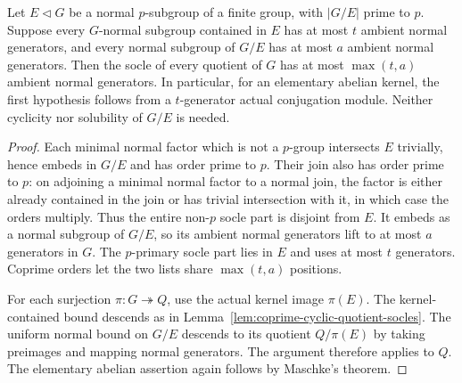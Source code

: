\begin{lemma}
\label{lem:coprime-quotient-socles}
Let $E\lhd G$ be a normal $p$-subgroup of a finite group, with
$|G/E|$ prime to $p$. Suppose every $G$-normal subgroup contained in
$E$ has at most $t$ ambient normal generators, and every normal
subgroup of $G/E$ has at most $a$ ambient normal generators.
Then the socle of every quotient of $G$ has at most $\max(t,a)$
ambient normal generators. In particular, for an elementary abelian
kernel, the first hypothesis follows from a $t$-generator actual
conjugation module. Neither cyclicity nor solubility of $G/E$ is needed.
\end{lemma}
\begin{proof}
Each minimal normal factor which is not a $p$-group intersects $E$
trivially, hence embeds in $G/E$ and has order prime to $p$. Their
join also has order prime to $p$: on adjoining a minimal normal
factor to a normal join, the factor is either already contained in
the join or has trivial intersection with it, in which case the
orders multiply. Thus the entire non-$p$ socle part is disjoint from
$E$. It embeds as a normal subgroup of $G/E$, so its ambient normal
generators lift to at most $a$ generators in $G$. The $p$-primary
socle part lies in $E$ and uses at most $t$ generators. Coprime
orders let the two lists share $\max(t,a)$ positions.

For each surjection $\pi:G\twoheadrightarrow Q$, use the actual
kernel image $\pi(E)$. The kernel-contained bound descends as in
Lemma~\ref{lem:coprime-cyclic-quotient-socles}. The uniform normal
bound on $G/E$ descends to its quotient $Q/\pi(E)$ by taking
preimages and mapping normal generators. The argument therefore
applies to $Q$. The elementary abelian assertion again follows by
Maschke's theorem.
\end{proof}

